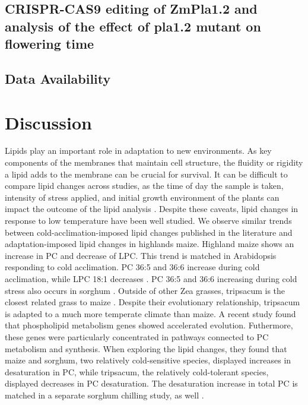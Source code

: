 \documentclass[9pt,twocolumn,twoside,lineno]{gsajnl}
\begin{document}
\subsection{CRISPR-CAS9 editing of ZmPla1.2 and analysis of the effect of pla1.2 mutant on flowering time}

\subsection{Data Availability}


\section{Discussion}
\label{sec:discusion}
Lipids play an important role in adaptation to new environments. As key components of the membranes that maintain cell structure, the fluidity or rigidity a lipid adds to the membrane can be crucial for survival. It can be difficult to compare lipid changes across studies, as the time of day the sample is taken, intensity of stress applied, and initial growth environment of the plants can impact the outcome of the lipid analysis \cite{Kenchanmane_Raju2018-nz}. Despite these caveats, lipid changes in response to low temperature have been well studied. We observe similar trends between cold-acclimation-imposed lipid changes published in the literature and adaptation-imposed lipid changes in highlands maize. Highland maize shows an increase in PC and decrease of LPC. This trend is matched in Arabidopsis responding to cold acclimation. PC 36:5 and 36:6 increase during cold acclimation, while LPC 18:1 decreases \cite{Welti2002-uk}. PC 36:5 and 36:6 increasing during cold stress also occurs in sorghum \cite{Marla2017-ph}. 
Outside of other Zea grasses, tripsacum is the closest related grass to maize \cite{Yang2013-lg}. Despite their evolutionary relationship, tripsacum is adapted to a much more temperate climate than maize. A recent study found that phospholipid metabolism genes showed accelerated evolution\cite{Yang2013-lg}. Futhermore, these genes were particularly concentrated in pathways connected to PC metabolism and synthesis. When exploring the lipid changes, they found that maize and sorghum, two relatively cold-sensitive species, displayed increases in desaturation in PC, while tripsacum, the relatively cold-tolerant species, displayed decreases in PC desaturation. The desaturation increase in total PC is matched in a separate sorghum chilling study, as well \cite{Marla2017-ph}. 
\end{document}
